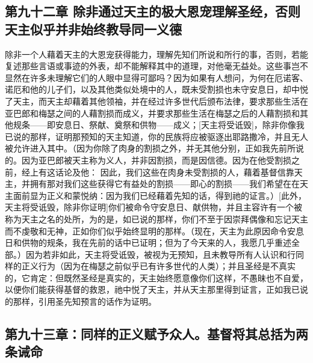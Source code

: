 \subsection{第九十二章 除非通过天主的极大恩宠理解圣经，否则天主似乎并非始终教导同一义德}

除非一个人藉着天主的大恩宠获得能力，理解先知们所说和所行的事，否则，若能复述那些言语或事迹的外表，却不能解释其中的道理，对他毫无益处。这些事岂不显然在许多未理解它们的人眼中显得可鄙吗？因为如果有人想问，为何在厄诺客、诺厄和他的儿子们，以及其他类似处境中的人，既未受割损也未守安息日，却中悦了天主，而天主却藉着其他领袖，并在经过许多世代后颁布法律，要求那些生活在亚巴郎和梅瑟之间的人藉割损而成义，并要求那些生活在梅瑟之后的人藉割损和其他规条——即安息日、祭献、奠祭和供物——成义；[天主将受诋毁]，除非你像我已说的那样，证明那预知的天主知道，你的民族将应被驱逐出耶路撒冷，并且无人被允许进入其中。（因为你除了肉身的割损之外，并无其他分别，正如我先前所说的。因为亚巴郎被天主称为义人，并非因割损，而是因信德。因为在他受割损之前，经上有这话论及他： 因此，我们这些在肉身未受割损的人，藉着基督信靠天主，并拥有那对我们这些获得它有益处的割损——即心的割损——我们希望在在天主面前显为正义和蒙悦纳：因为我们已经藉着先知的话，得到祂的证言。）[此外，天主将受诋毁，除非你证明]你们被命令守安息日、献供物，并且主容许有一个被称为天主之名的处所，为的是，如已说的那样，你们不至于因崇拜偶像和忘记天主而不虔敬和无神，正如你们似乎始终显明的那样。（现在，天主为此原因命令安息日和供物的规条，我在先前的话中已证明；但为了今天来的人，我愿几乎重述全部。）因为若非如此，天主将受诋毁，被视为无预知，且未教导所有人认识和行同样的正义行为（因为在梅瑟之前似乎已有许多世代的人类）；并且圣经是不真实的，它肯定：但既然圣经是真实的，天主始终愿意像你们这样，不愚昧也不自爱，以便你们能获得基督的救恩，祂中悦了天主，并从天主那里得到证言，正如我已说的那样，引用圣先知预言的话作为证明。\par


\subsection{第九十三章：同样的正义赋予众人。基督将其总括为两条诫命}

